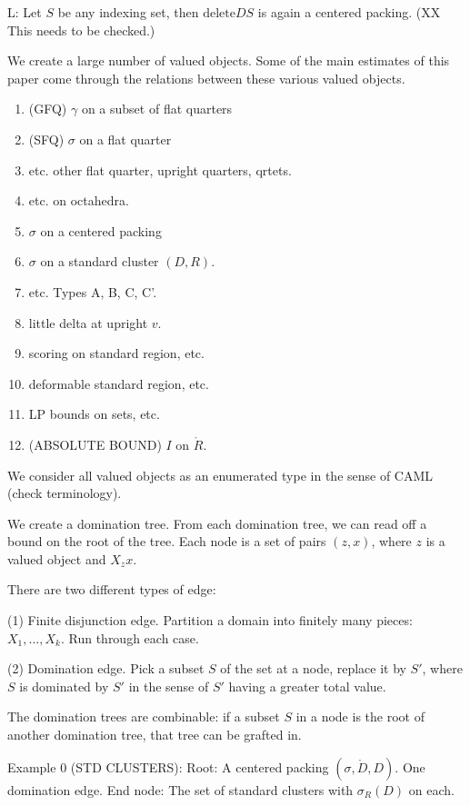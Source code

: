 L: Let $S$ be any indexing set, then $\text{delete} D S$ is again
a centered packing. (XX This needs to be checked.)

We create a large number of valued objects.  Some of the main estimates
of this paper come through the relations between these various valued
objects.

\begin{enumerate}
\item (GFQ) $\gamma$ on a subset of flat quarters \item (SFQ)
$\sigma$ on a flat quarter \item etc. other flat quarter, upright
quarters, qrtets. \item etc. on octahedra. \item $\sigma$ on a
centered packing \item $\sigma$ on a standard cluster $(D,R)$.
\item etc. Types A, B, C, C'. \item little delta at upright $v$.
\item scoring on standard region, etc. \item deformable
standard region, etc. \item LP bounds on sets, etc. \item
(ABSOLUTE BOUND) $I$ on $\ring{R}$.
\end{enumerate}

We consider all valued objects as an enumerated type in the sense of CAML
(check terminology).

We create a domination tree.  From each domination tree, we can read off
a bound on the root of the tree.
Each node is a set of pairs $(z,x)$, where $z$ is a valued object and
$X_z x$.

There are two different types of edge:

(1) Finite disjunction edge.
Partition a domain into finitely many pieces: $X_1,\ldots, X_k$.
Run through each case.

(2) Domination edge.  Pick a subset $S$ of the set at a node, replace
it by $S'$, where $S$ is dominated by $S'$ in the sense of $S'$ having
a greater total value.

The domination trees are combinable: if a subset $S$ in a node is
the root of another domination tree, that tree can be grafted in.

Example 0 (STD CLUSTERS): Root: A centered packing
$(\sigma,\ring{D},D)$. One domination edge. End node: The set of
standard clusters with $\sigma_R(D)$ on each.

